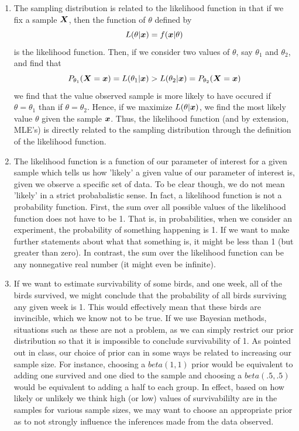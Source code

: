 \documentclass[12pt]{article}\usepackage[]{graphicx}\usepackage[]{color}
\newcommand{\bfX}{\mbox{\boldmath $X$}}
\newcommand{\bfx}{\mbox{\boldmath $x$}}
\begin{document}
\begin{enumerate}
\item The sampling distribution is related to the likelihood function in that if we fix a sample $\bfX$, then the function of $\theta$ defined by
\[ L(\theta | \bfx) = f(\bfx | \theta) \]
is the likelihood function. Then, if we consider two values of $\theta$, say $\theta_1$ and $\theta_2$, and find that 
\[ P_{\theta_1}( \bfX = \bfx) = L(\theta_1 | \bfx) > L(\theta_2 | \bfx) = P_{\theta_2}(\bfX = \bfx) \]
we find that the value observed sample is more likely to have occured if $\theta = \theta_1$ than if $\theta = \theta_2$. Hence, if we maximize $L(\theta | \bfx)$, we find the most likely value $\theta$ given the sample $\bfx$. Thus, the likelihood function (and by extension, MLE's) is directly related to the sampling distribution through the definition of the likelihood function. 
\item The likelihood function is a function of our parameter of interest for a given sample which tells us how 'likely' a given value of our parameter of interest is, given we observe a specific set of data. To be clear though, we do not mean 'likely' in a strict probabalistic sense. In fact, a likelihood function is not a probability function. First, the sum over all possible values of the likelihood function does not have to be 1. That is, in probabilities, when we consider an experiment, the probability of something happening is 1. If we want to make further statements about what that something is, it might be less than 1 (but greater than zero). In contrast, the sum over the likelihood function can be any nonnegative real number (it might even be infinite). 

\item If we want to estimate survivability of some birds, and one week, all of the birds survived, we might conclude that the probability of all birds surviving any given week is 1. This would effectively mean that these birds are invincible, which we know not to be true. If we use Bayesian methods, situations  such as these are not a problem, as we can simply restrict our prior distribution so that it is impossible to conclude survivability of 1. As pointed out in class, our choice of prior can in some ways be related to increasing our sample size. For instance, choosing a $beta(1,1)$ prior would be equivalent to adding one survived and one died to the sample and choosing a $beta(.5,.5)$ would be equivalent to adding a half to each group. In effect, based on how likely or unlikely we think high (or low) values of survivabililty are in the samples for various sample sizes, we may want to choose an appropriate prior as to not strongly influence the inferences made from the data observed.


\end{enumerate}
\end{document}
